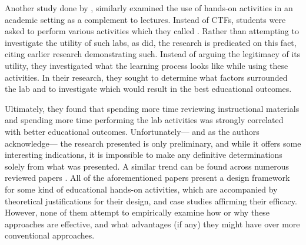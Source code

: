     Another study done by \textcite{Z-Zeng}, similarly examined the use of hands-on activities in an academic setting as a complement to lectures. %
Instead of CTFs, students were asked to perform various activities which they called . %
Rather than attempting to investigate the utility of such labs, as \textcite{K-Leune} did, the research is predicated on this fact, citing earlier research demonstrating such. %
Instead of arguing the legitimacy of its utility, they investigated what the learning process looks like while using these activities. %
In their research, they sought to determine what factors surrounded the lab and to investigate which would result in the best educational outcomes. 

    Ultimately, they found that spending more time reviewing instructional materials and spending more time performing the lab activities was strongly correlated with better educational outcomes. %
Unfortunately---%
and as the authors acknowledge---%
the research presented is only preliminary, and while it offers some interesting indications, it is impossible to make any definitive determinations solely from what was presented. %
A similar trend can be found across numerous reviewed papers \cite{Y-Deng,W-Du,N-Eliot}. %
All of the aforementioned papers present a design framework for some kind of educational hands-on activities, which are accompanied by theoretical justifications for their design, and case studies affirming their efficacy. %
However, none of them attempt to empirically examine how or why these approaches are effective, and what advantages (if any) they might have over more conventional approaches. 

